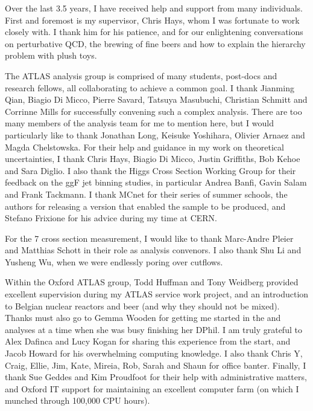 
Over the last 3.5 years, I have received help and support from many individuals. First and 
foremost is my supervisor, Chris Hays, whom I was fortunate to work closely with. I thank him 
for his patience, and for our enlightening conversations on perturbative QCD, the brewing of 
fine beers and how to explain the hierarchy problem with plush toys.

The ATLAS \HWW analysis group is comprised of many students, post-docs and research fellows, 
all collaborating to achieve a common goal. I thank Jianming Qian, Biagio Di Micco, Pierre 
Savard, Tatsuya Masubuchi, Christian Schmitt and Corrinne Mills for successfully convening 
such a complex analysis. There are too many members of the analysis team for me to mention 
here, but I would particularly like to thank Jonathan Long, Keisuke Yoshihara, Olivier 
Arnaez and Magda Chelstowska. For their help and guidance in my work on theoretical 
uncertainties, I thank Chris Hays, Biagio Di Micco, Justin Griffiths, Bob Kehoe and Sara 
Diglio. I also thank the Higgs Cross Section Working Group for their feedback on the ggF jet 
binning studies, in particular Andrea Banfi, Gavin Salam and Frank Tackmann. I thank MCnet 
for their series of summer schools, the \sherpa authors for releasing a version that enabled 
the \Wgstar sample to be produced, and Stefano Frixione for his advice during my time at CERN.

For the \unit{7}{\TeV} \WW cross section measurement, I would like to thank Marc-Andre Pleier 
and Matthias Schott in their role as analysis convenors. I also thank Shu Li and Yusheng Wu, 
when we were endlessly poring over cutflows.

Within the Oxford ATLAS group, Todd Huffman and Tony Weidberg provided excellent supervision 
during my ATLAS service work project, and an introduction to Belgian nuclear reactors and 
beer (and why they should not be mixed). Thanks must also go to Gemma Wooden for getting me 
started in the \WW and \HWW analyses at a time when she was busy finishing her DPhil. I am 
truly grateful to Alex Dafinca and Lucy Kogan for sharing this experience from the start, and 
Jacob Howard for his overwhelming computing knowledge. I also thank Chris Y, Craig, Ellie, 
Jim, Kate, Mireia, Rob, Sarah and Shaun for office banter. Finally, I thank Sue Geddes and 
Kim Proudfoot for their help with administrative matters, and Oxford IT support for 
maintaining an excellent computer farm (on which I munched through 100,000 CPU hours).

